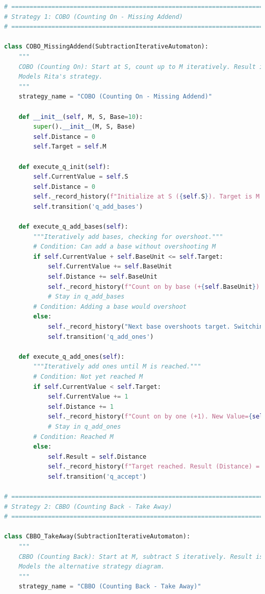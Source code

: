 \documentclass[11pt]{article}
\begin{document}
\begin{lstlisting}[language=Python]
# =============================================================================
# Strategy 1: COBO (Counting On - Missing Addend)
# =============================================================================

class COBO_MissingAddend(SubtractionIterativeAutomaton):
    """
    COBO (Counting On): Start at S, count up to M iteratively. Result is distance.
    Models Rita's strategy.
    """
    strategy_name = "COBO (Counting On - Missing Addend)"

    def __init__(self, M, S, Base=10):
        super().__init__(M, S, Base)
        self.Distance = 0
        self.Target = self.M

    def execute_q_init(self):
        self.CurrentValue = self.S
        self.Distance = 0
        self._record_history(f"Initialize at S ({self.S}). Target is M ({self.M}).")
        self.transition('q_add_bases')

    def execute_q_add_bases(self):
        """Iteratively add bases, checking for overshoot."""
        # Condition: Can add a base without overshooting M
        if self.CurrentValue + self.BaseUnit <= self.Target:
            self.CurrentValue += self.BaseUnit
            self.Distance += self.BaseUnit
            self._record_history(f"Count on by base (+{self.BaseUnit}). New Value={self.CurrentValue}.")
            # Stay in q_add_bases
        # Condition: Adding a base would overshoot
        else:
            self._record_history("Next base overshoots target. Switching to ones.")
            self.transition('q_add_ones')

    def execute_q_add_ones(self):
        """Iteratively add ones until M is reached."""
        # Condition: Not yet reached M
        if self.CurrentValue < self.Target:
            self.CurrentValue += 1
            self.Distance += 1
            self._record_history(f"Count on by one (+1). New Value={self.CurrentValue}.")
            # Stay in q_add_ones
        # Condition: Reached M
        else:
            self.Result = self.Distance
            self._record_history(f"Target reached. Result (Distance) = {self.Result}.")
            self.transition('q_accept')

# =============================================================================
# Strategy 2: CBBO (Counting Back - Take Away)
# =============================================================================

class CBBO_TakeAway(SubtractionIterativeAutomaton):
    """
    CBBO (Counting Back): Start at M, subtract S iteratively. Result is final position.
    Models the alternative strategy diagram.
    """
    strategy_name = "CBBO (Counting Back - Take Away)"


\end{lstlisting}
\end{document}
